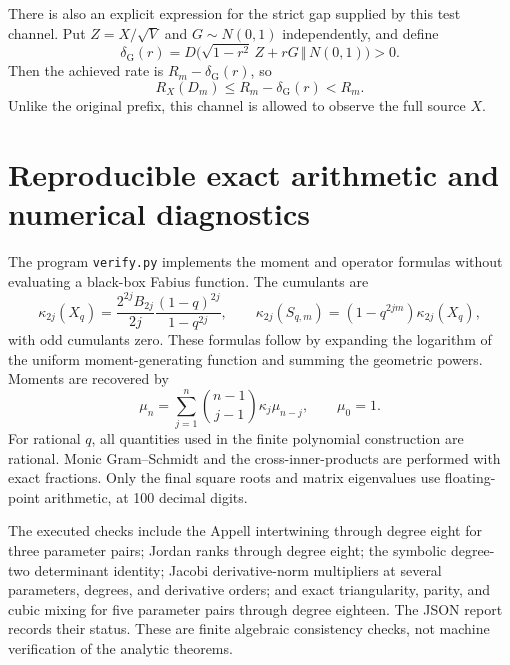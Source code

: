 \documentclass[11pt,a4paper]{article}
\numberwithin{equation}{section}
\theoremstyle{definition}\newtheorem{definition}[theorem]{Definition}
\theoremstyle{remark}\newtheorem{remark}[theorem]{Remark}
\begin{document}
There is also an explicit expression for the strict gap supplied by this test channel. Put $Z=X/\sqrt V$ and $G\sim N(0,1)$ independently, and define
\[
 \delta_{\mathrm G}(r)=D\bigl(\sqrt{1-r^2}\,Z+rG\,\Vert\,N(0,1)\bigr)>0.
\]
Then the achieved rate is $R_m-\delta_{\mathrm G}(r)$, so
\begin{equation}
 R_X(D_m)\le R_m-\delta_{\mathrm G}(r)<R_m.
 \label{eq:RD-quantitative}
\end{equation}
Unlike the original prefix, this channel is allowed to observe the full source $X$.

\section{Reproducible exact arithmetic and numerical diagnostics}
\label{sec:computations}
The program \texttt{verify.py} implements the moment and operator formulas without evaluating a black-box Fabius function. The cumulants are
\begin{equation}
 \kappa_{2j}(X_q)=\frac{2^{2j}B_{2j}}{2j}
 \frac{(1-q)^{2j}}{1-q^{2j}},\qquad
 \kappa_{2j}(S_{q,m})=(1-q^{2jm})\kappa_{2j}(X_q),
 \label{eq:cumulants}
\end{equation}
with odd cumulants zero. These formulas follow by expanding the logarithm of the uniform moment-generating function and summing the geometric powers. Moments are recovered by
\begin{equation}
 \mu_n=\sum_{j=1}^n\binom{n-1}{j-1}\kappa_j\mu_{n-j},\qquad\mu_0=1.
 \label{eq:moment-recurrence}
\end{equation}
For rational $q$, all quantities used in the finite polynomial construction are rational. Monic Gram--Schmidt and the cross-inner-products are performed with exact fractions. Only the final square roots and matrix eigenvalues use floating-point arithmetic, at 100 decimal digits.

The executed checks include the Appell intertwining through degree eight for three parameter pairs; Jordan ranks through degree eight; the symbolic degree-two determinant identity; Jacobi derivative-norm multipliers at several parameters, degrees, and derivative orders; and exact triangularity, parity, and cubic mixing for five parameter pairs through degree eighteen. The JSON report records their status. These are finite algebraic consistency checks, not machine verification of the analytic theorems.
\end{document}
